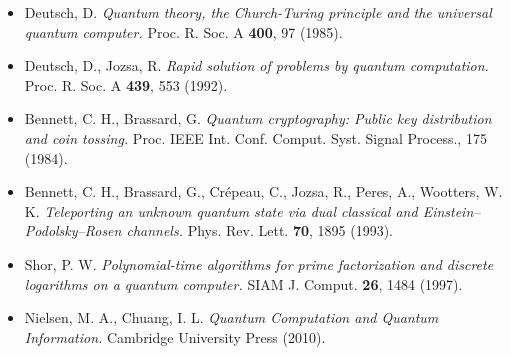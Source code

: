 \documentclass[11pt,a4paper]{article}
\begin{document}
\begin{itemize}[leftmargin=*,itemsep=2pt]
  \item Deutsch, D. \emph{Quantum theory, the Church-Turing principle and the universal quantum computer.} Proc. R. Soc. A \textbf{400}, 97 (1985).
  \item Deutsch, D., Jozsa, R. \emph{Rapid solution of problems by quantum computation.} Proc. R. Soc. A \textbf{439}, 553 (1992).
  \item Bennett, C. H., Brassard, G. \emph{Quantum cryptography: Public key distribution and coin tossing.} Proc. IEEE Int. Conf. Comput. Syst. Signal Process., 175 (1984).
  \item Bennett, C. H., Brassard, G., Cr\'epeau, C., Jozsa, R., Peres, A., Wootters, W. K. \emph{Teleporting an unknown quantum state via dual classical and Einstein--Podolsky--Rosen channels.} Phys. Rev. Lett. \textbf{70}, 1895 (1993).
  \item Shor, P. W. \emph{Polynomial-time algorithms for prime factorization and discrete logarithms on a quantum computer.} SIAM J. Comput. \textbf{26}, 1484 (1997).
  \item Nielsen, M. A., Chuang, I. L. \emph{Quantum Computation and Quantum Information.} Cambridge University Press (2010).
\end{itemize}
\end{document}
